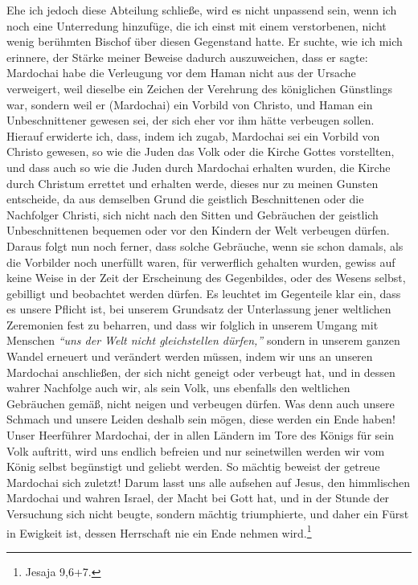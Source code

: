 Ehe ich jedoch diese Abteilung schließe, wird es nicht unpassend sein, wenn ich
noch eine Unterredung hinzufüge, die ich einst mit einem verstorbenen, nicht
wenig berühmten Bischof über diesen
Gegenstand
hatte. Er suchte, wie ich mich
erinnere, der Stärke meiner Beweise dadurch auszuweichen, dass er sagte:
Mardochai habe die Verleugung vor dem Haman nicht
aus der Ursache verweigert,
weil dieselbe ein Zeichen der Verehrung des königlichen Günstlings war, sondern
weil er (Mardochai) ein Vorbild von Christo, und Haman ein Unbeschnittener
gewesen sei, der sich eher vor ihm hätte verbeugen sollen. Hierauf erwiderte
ich, dass, indem ich zugab, Mardochai sei ein Vorbild von Christo gewesen, so
wie die Juden das Volk oder die Kirche Gottes vorstellten, und dass auch so wie
die Juden durch Mardochai erhalten wurden, die
Kirche durch Christum errettet
und erhalten werde, dieses nur zu meinen Gunsten entscheide, da aus demselben
Grund die geistlich Beschnittenen oder die
Nachfolger Christi, sich nicht nach
den Sitten und Gebräuchen der geistlich Unbeschnittenen bequemen oder vor den
Kindern der Welt verbeugen dürfen. Daraus folgt nun noch ferner, dass solche
Gebräuche, wenn sie schon damals, als die Vorbilder noch unerfüllt waren, für
verwerflich gehalten wurden, gewiss auf keine Weise in der Zeit der Erscheinung
des Gegenbildes, oder des Wesens selbst, gebilligt und beobachtet werden dürfen.
Es leuchtet im Gegenteile klar ein, dass es unsere Pflicht ist, bei unserem
Grundsatz der Unterlassung jener weltlichen Zeremonien fest zu beharren, und
dass wir folglich in unserem Umgang mit Menschen
\textit{"`uns der Welt nicht gleichstellen dürfen,"'}
sondern in unserem ganzen Wandel erneuert und verändert
werden müssen, indem wir uns an unseren Mardochai anschließen, der sich nicht
geneigt oder verbeugt hat, und in dessen wahrer Nachfolge auch wir, als sein
Volk, uns ebenfalls den weltlichen Gebräuchen gemäß, nicht neigen und verbeugen
dürfen. Was denn auch unsere Schmach und unsere Leiden deshalb sein mögen, diese
werden ein Ende haben! Unser Heerführer Mardochai, der in allen Ländern im Tore
des Königs für sein Volk auftritt, wird uns endlich befreien und nur
seinetwillen werden wir vom König selbst begünstigt und geliebt werden. So
mächtig beweist der getreue Mardochai sich zuletzt! Darum lasst uns alle
aufsehen auf Jesus, den himmlischen Mardochai und wahren
Israel, der Macht bei
Gott hat, und in der Stunde der Versuchung sich nicht beugte,
sondern mächtig
triumphierte, und daher ein Fürst in Ewigkeit ist, dessen Herrschaft nie ein
Ende
nehmen wird.\footnote{Jesaja 9,6+7.}

